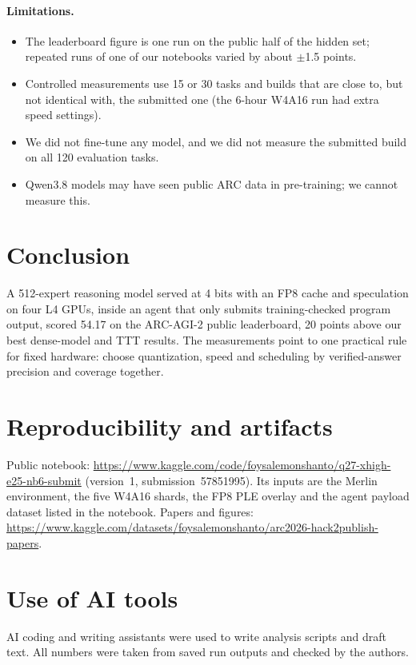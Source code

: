 \documentclass[11pt]{article}
\begin{document}
\paragraph{Limitations.}
\begin{itemize}
\item The leaderboard figure is one run on the public half of the hidden set; repeated runs of one of our notebooks varied by about $\pm$1.5 points.
\item Controlled measurements use 15 or 30 tasks and builds that are close to, but not identical with, the submitted one (the 6-hour W4A16 run had extra speed settings).
\item We did not fine-tune any model, and we did not measure the submitted build on all 120 evaluation tasks.
\item Qwen3.8 models may have seen public ARC data in pre-training; we cannot measure this.
\end{itemize}

\section{Conclusion}
A 512-expert reasoning model served at 4 bits with an FP8 cache and speculation on four L4 GPUs, inside an agent that only submits training-checked program output, scored 54.17 on the ARC-AGI-2 public leaderboard, 20 points above our best dense-model and TTT results. The measurements point to one practical rule for fixed hardware: choose quantization, speed and scheduling by verified-answer precision and coverage together.

\section*{Reproducibility and artifacts}
Public notebook: \url{https://www.kaggle.com/code/foysalemonshanto/q27-xhigh-e25-nb6-submit} (version~1, submission~57851995). Its inputs are the Merlin environment, the five W4A16 shards, the FP8 PLE overlay and the agent payload dataset listed in the notebook. Papers and figures: \url{https://www.kaggle.com/datasets/foysalemonshanto/arc2026-hack2publish-papers}.

\section*{Use of AI tools}
AI coding and writing assistants were used to write analysis scripts and draft text. All numbers were taken from saved run outputs and checked by the authors.



\end{document}
